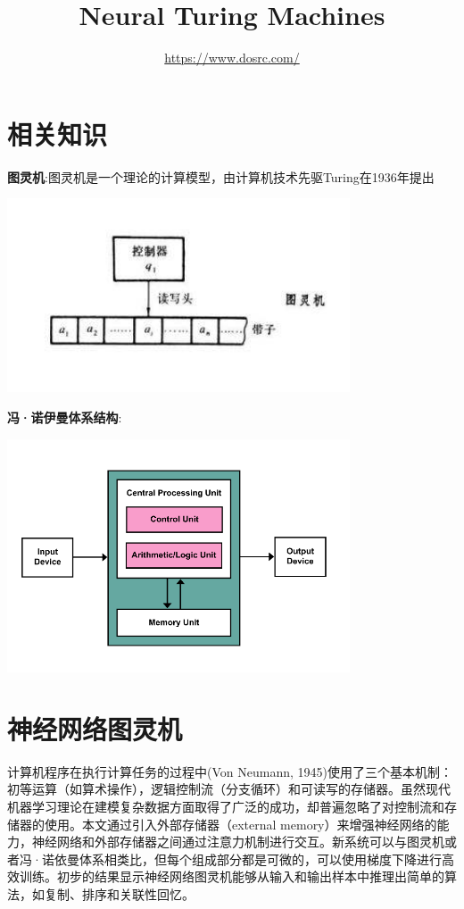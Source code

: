 \documentclass{article} %
\title{Neural Turing Machines}
\author{
 \url{https://www.dosrc.com/}
}
\begin{document}
\begin{CJK*}{UTF8}{gkai}

\maketitle

\section{相关知识}


\textbf{图灵机}:图灵机是一个理论的计算模型，由计算机技术先驱Turing在1936年提出
\begin{center}
\includegraphics[width=4in]{turing-machines.png}
\end{center}
\textbf{冯·诺伊曼体系结构}:
\begin{center}
\includegraphics[width=4in]{von-neuman-architecture.png}
\end{center}

\section{神经网络图灵机}
计算机程序在执行计算任务的过程中(Von Neumann, 1945)使用了三个基本机制：初等运算（如算术操作），逻辑控制流（分支循环）和可读写的存储器。虽然现代机器学习理论在建模复杂数据方面取得了广泛的成功，却普遍忽略了对控制流和存储器的使用。本文通过引入外部存储器（external memory）来增强神经网络的能力，神经网络和外部存储器之间通过注意力机制进行交互。新系统可以与图灵机或者冯·诺依曼体系相类比，但每个组成部分都是可微的，可以使用梯度下降进行高效训练。初步的结果显示神经网络图灵机能够从输入和输出样本中推理出简单的算法，如复制、排序和关联性回忆。


\end{CJK*}
\end{document}
